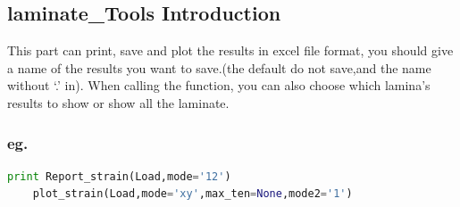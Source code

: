 \documentclass{article}
\begin{document}
	\subsection{laminate\_Tools Introduction}
		This part can print, save and plot the results in excel file format, you should give a name of the results you want to save.(the default do not save,and the name without `.' in). When calling the function, you can also choose which lamina's results to show or show all the laminate. 

		\subsubsection{eg.}	
		\begin{lstlisting}[language={Python}] 
	print Report_strain(Load,mode='12')
	plot_strain(Load,mode='xy',max_ten=None,mode2='1')
		\end{lstlisting}		
\end{document}
